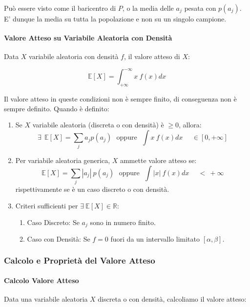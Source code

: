 \documentclass{article}
\begin{document}
Può essere visto come il baricentro di $P$, o la media delle $a_{j}$ pesata con $p(a_{j})$. E' dunque la media su tutta la popolazione e non su un singolo campione.

\paragraph{Valore Atteso su Variabile Aleatoria con Densità} Data $X$ variabile aleatoria con densità $f$, il valore atteso di $X$:

\[ \mathbb{E}[X] = \int_{+\infty}^{-\infty} x\:f(x) dx \]

Il valore atteso in queste condizioni non è sempre finito, di conseguenza non è sempre definito. Quando è definito:

\begin{enumerate}
    \item Se $X$ variabile aleatoria (discreta o con densità) è $\geq 0$, allora:
    \[ \exists \:\: \mathbb{E}[X] = \sum_{j} a_{j}p(a_{j}) \:\:\: \text{oppure} \:\:\: \int x\:f(x)dx \:\:\:\:\:\: \in [0,+\infty] \]
    \item Per variabile aleatoria generica, $X$ ammette valore atteso se:
    \[ \mathbb{E}[X] = \sum_{j} |a_{j}|\:p(a_{j}) \:\:\: \text{oppure} \:\:\: \int |x|\:f(x)dx \:\:\:\:\:\: < \: +\infty \]
    rispettivamente se è un caso discreto o con densità.
    \item Criteri sufficienti per $\exists \: \mathbb{E}[X] \in \mathbb{R}$:
    \begin{enumerate}
        \item Caso Discreto: Se $a_{j}$ sono in numero finito.
        \item Caso con Densità: Se $f=0$ fuori da un intervallo limitato $[\alpha,\beta]$.
    \end{enumerate}
\end{enumerate}

\newpage

\subsubsection{Calcolo e Proprietà del Valore Atteso}

\paragraph{Calcolo Valore Atteso} Data una variabile aleatoria $X$ discreta o con densità, calcoliamo il valore atteso:
\end{document}
